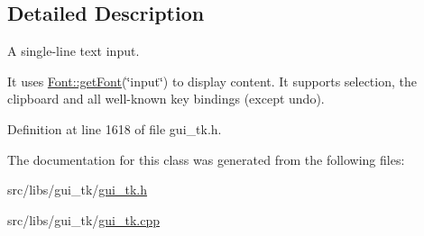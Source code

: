 \subsection{Detailed Description}
A single-\/line text input. 

It uses \hyperlink{classGUI_1_1Font_a19c023d747809a4cfa6142d33bdff53a}{Font\-::get\-Font}(\char`\"{}input\char`\"{}) to display content. It supports selection, the clipboard and all well-\/known key bindings (except undo). 

Definition at line 1618 of file gui\-\_\-tk.\-h.



The documentation for this class was generated from the following files\-:\begin{DoxyCompactItemize}
\item 
src/libs/gui\-\_\-tk/\hyperlink{gui__tk_8h}{gui\-\_\-tk.\-h}\item 
src/libs/gui\-\_\-tk/\hyperlink{gui__tk_8cpp}{gui\-\_\-tk.\-cpp}\end{DoxyCompactItemize}
